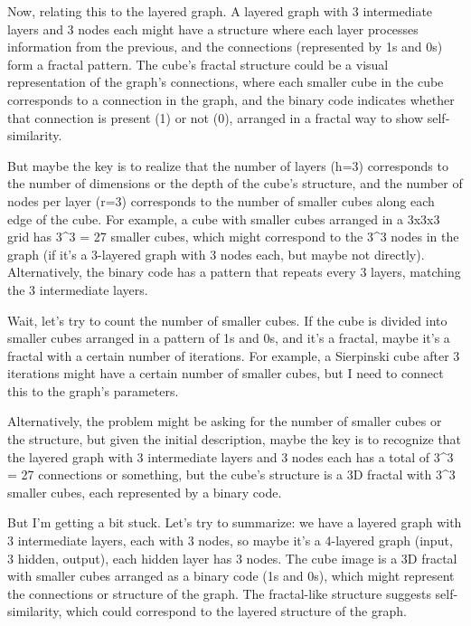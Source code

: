 Now, relating this to the layered graph. A layered graph with 3 intermediate layers and 3 nodes each might have a structure where each layer processes information from the previous, and the connections (represented by 1s and 0s) form a fractal pattern. The cube's fractal structure could be a visual representation of the graph's connections, where each smaller cube in the cube corresponds to a connection in the graph, and the binary code indicates whether that connection is present (1) or not (0), arranged in a fractal way to show self-similarity.

But maybe the key is to realize that the number of layers (h=3) corresponds to the number of dimensions or the depth of the cube's structure, and the number of nodes per layer (r=3) corresponds to the number of smaller cubes along each edge of the cube. For example, a cube with smaller cubes arranged in a 3x3x3 grid has 3^3 = 27 smaller cubes, which might correspond to the 3^3 nodes in the graph (if it's a 3-layered graph with 3 nodes each, but maybe not directly). Alternatively, the binary code has a pattern that repeats every 3 layers, matching the 3 intermediate layers.

Wait, let's try to count the number of smaller cubes. If the cube is divided into smaller cubes arranged in a pattern of 1s and 0s, and it's a fractal, maybe it's a fractal with a certain number of iterations. For example, a Sierpinski cube after 3 iterations might have a certain number of smaller cubes, but I need to connect this to the graph's parameters.

Alternatively, the problem might be asking for the number of smaller cubes or the structure, but given the initial description, maybe the key is to recognize that the layered graph with 3 intermediate layers and 3 nodes each has a total of 3^3 = 27 connections or something, but the cube's structure is a 3D fractal with 3^3 smaller cubes, each represented by a binary code.

But I'm getting a bit stuck. Let's try to summarize: we have a layered graph with 3 intermediate layers, each with 3 nodes, so maybe it's a 4-layered graph (input, 3 hidden, output), each hidden layer has 3 nodes. The cube image is a 3D fractal with smaller cubes arranged as a binary code (1s and 0s), which might represent the connections or structure of the graph. The fractal-like structure suggests self-similarity, which could correspond to the layered structure of the graph.


